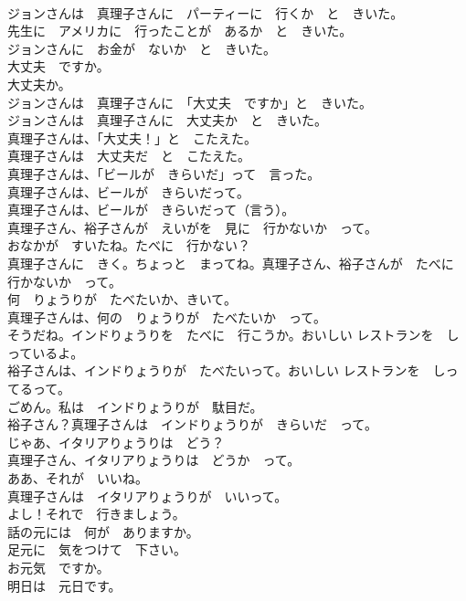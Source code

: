 \documentclass[8pt]{extreport}
\begin{document}
\begin{CJK}{UTF8}{min}
\\	ジョンさんは　真理子さんに　パーティーに　行くか　と　きいた。	
\\	先生に　アメリカに　行ったことが　あるか　と　きいた。	
\\	ジョンさんに　お金が　ないか　と　きいた。	
\\	大丈夫　ですか。	
\\	大丈夫か。	
\\	ジョンさんは　真理子さんに　「大丈夫　ですか」と　きいた。	
\\	ジョンさんは　真理子さんに　大丈夫か　と　きいた。	
\\	真理子さんは、「大丈夫！」と　こたえた。	
\\	真理子さんは　大丈夫だ　と　こたえた。	
\\	真理子さんは、「ビールが　きらいだ」って　言った。	
\\	真理子さんは、ビールが　きらいだって。	
\\	真理子さんは、ビールが　きらいだって（言う）。	
\\	真理子さん、裕子さんが　えいがを　見に　行かないか　って。	
\\	おなかが　すいたね。たべに　行かない？	
\\	真理子さんに　きく。ちょっと　まってね。真理子さん、裕子さんが　たべに　行かないか　って。	
\\	何　りょうりが　たべたいか、きいて。	
\\	真理子さんは、何の　りょうりが　たべたいか　って。	
\\	そうだね。インドりょうりを　たべに　行こうか。おいしい レストランを　しっているよ。	
\\	裕子さんは、インドりょうりが　たべたいって。おいしい レストランを　しってるって。	
\\	ごめん。私は　インドりょうりが　駄目だ。	
\\	裕子さん？真理子さんは　インドりょうりが　きらいだ　って。	
\\	じゃあ、イタリアりょうりは　どう？	
\\	真理子さん、イタリアりょうりは　どうか　って。	
\\	ああ、それが　いいね。	
\\	真理子さんは　イタリアりょうりが　いいって。	
\\	よし！それで　行きましょう。	
\\	話の元には　何が　ありますか。	
\\	足元に　気をつけて　下さい。	
\\	お元気　ですか。	
\\	明日は　元日です。	

\end{CJK}
\end{document}
